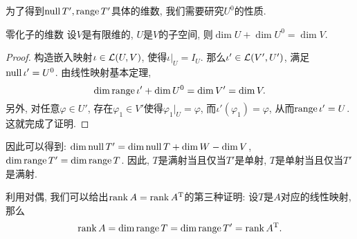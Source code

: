 为了得到$\operatorname{null} T',\operatorname{range} T'$具体的维数, 我们需要研究$U^0$的性质. 

\begin{proposition}{零化子的维数}
	设$V$是有限维的, $U$是$V$的子空间, 则$\dim U + \dim U^0 = \dim V$. 
\end{proposition}
\begin{proof}
	构造嵌入映射$\iota \in \mathcal{L} (U,V)$, 使得$\iota |_U=I_U$. 那么$\iota ' \in \mathcal{L} (V',U')$, 满足$\operatorname{null} \iota ' = U^0$. 由线性映射基本定理, $$\dim \operatorname{range} \iota '+ \dim U^0 = \dim V' = \dim V. $$
	另外, 对任意$\varphi \in U'$, 存在$\varphi _1 \in V'$使得$\varphi _1|_U = \varphi$, 而$\iota ' (\varphi _1) = \varphi$, 从而$\operatorname{range} \iota ' = U$. 这就完成了证明. 
\end{proof}

因此可以得到: $\dim \operatorname{null} T' = \dim \operatorname{null} T + \dim W - \dim V$, $\dim \operatorname{range} T' = \dim \operatorname{range} T$. 因此, $T$是满射当且仅当$T'$是单射, $T$是单射当且仅当$T'$是满射. 

利用对偶, 我们可以给出$\operatorname{rank} A = \operatorname{rank} A^{\operatorname{T}}$的第三种证明: 设$T$是$A$对应的线性映射, 那么$$\operatorname{rank} A = \dim \operatorname{range} T = \dim \operatorname{range} T' = \operatorname{rank} A^{\operatorname{T}}. $$